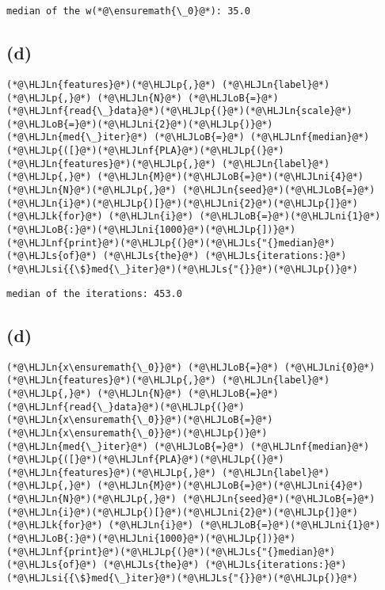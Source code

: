 \documentclass[12pt,a4paper]{article}
\newcommand{\HLJLk}[1]{\textcolor[RGB]{148,91,176}{\textbf{#1}}}
\newcommand{\HLJLn}[1]{#1}
\newcommand{\HLJLnf}[1]{\textcolor[RGB]{66,102,213}{#1}}
\newcommand{\HLJLs}[1]{\textcolor[RGB]{201,61,57}{#1}}
\newcommand{\HLJLsi}[1]{#1}
\newcommand{\HLJLni}[1]{\textcolor[RGB]{59,151,46}{#1}}
\newcommand{\HLJLoB}[1]{\textcolor[RGB]{102,102,102}{\textbf{#1}}}
\newcommand{\HLJLp}[1]{#1}
\begin{document}
\begin{lstlisting}
median of the w(*@\ensuremath{\_0}@*): 35.0
\end{lstlisting}


\subsection{(d)}

\begin{lstlisting}
(*@\HLJLn{features}@*)(*@\HLJLp{,}@*) (*@\HLJLn{label}@*)(*@\HLJLp{,}@*) (*@\HLJLn{N}@*) (*@\HLJLoB{=}@*) (*@\HLJLnf{read{\_}data}@*)(*@\HLJLp{(}@*)(*@\HLJLn{scale}@*)(*@\HLJLoB{=}@*)(*@\HLJLni{2}@*)(*@\HLJLp{)}@*)
(*@\HLJLn{med{\_}iter}@*) (*@\HLJLoB{=}@*) (*@\HLJLnf{median}@*)(*@\HLJLp{([}@*)(*@\HLJLnf{PLA}@*)(*@\HLJLp{(}@*)(*@\HLJLn{features}@*)(*@\HLJLp{,}@*) (*@\HLJLn{label}@*)(*@\HLJLp{,}@*) (*@\HLJLn{M}@*)(*@\HLJLoB{=}@*)(*@\HLJLni{4}@*)(*@\HLJLn{N}@*)(*@\HLJLp{,}@*) (*@\HLJLn{seed}@*)(*@\HLJLoB{=}@*)(*@\HLJLn{i}@*)(*@\HLJLp{)[}@*)(*@\HLJLni{2}@*)(*@\HLJLp{]}@*) (*@\HLJLk{for}@*) (*@\HLJLn{i}@*) (*@\HLJLoB{=}@*)(*@\HLJLni{1}@*)(*@\HLJLoB{:}@*)(*@\HLJLni{1000}@*)(*@\HLJLp{])}@*)
(*@\HLJLnf{print}@*)(*@\HLJLp{(}@*)(*@\HLJLs{"{}median}@*) (*@\HLJLs{of}@*) (*@\HLJLs{the}@*) (*@\HLJLs{iterations:}@*) (*@\HLJLsi{{\$}med{\_}iter}@*)(*@\HLJLs{"{}}@*)(*@\HLJLp{)}@*)
\end{lstlisting}

\begin{lstlisting}
median of the iterations: 453.0
\end{lstlisting}


\subsection{(d)}

\begin{lstlisting}
(*@\HLJLn{x\ensuremath{\_0}}@*) (*@\HLJLoB{=}@*) (*@\HLJLni{0}@*)
(*@\HLJLn{features}@*)(*@\HLJLp{,}@*) (*@\HLJLn{label}@*)(*@\HLJLp{,}@*) (*@\HLJLn{N}@*) (*@\HLJLoB{=}@*) (*@\HLJLnf{read{\_}data}@*)(*@\HLJLp{(}@*)(*@\HLJLn{x\ensuremath{\_0}}@*)(*@\HLJLoB{=}@*)(*@\HLJLn{x\ensuremath{\_0}}@*)(*@\HLJLp{)}@*)
(*@\HLJLn{med{\_}iter}@*) (*@\HLJLoB{=}@*) (*@\HLJLnf{median}@*)(*@\HLJLp{([}@*)(*@\HLJLnf{PLA}@*)(*@\HLJLp{(}@*)(*@\HLJLn{features}@*)(*@\HLJLp{,}@*) (*@\HLJLn{label}@*)(*@\HLJLp{,}@*) (*@\HLJLn{M}@*)(*@\HLJLoB{=}@*)(*@\HLJLni{4}@*)(*@\HLJLn{N}@*)(*@\HLJLp{,}@*) (*@\HLJLn{seed}@*)(*@\HLJLoB{=}@*)(*@\HLJLn{i}@*)(*@\HLJLp{)[}@*)(*@\HLJLni{2}@*)(*@\HLJLp{]}@*) (*@\HLJLk{for}@*) (*@\HLJLn{i}@*) (*@\HLJLoB{=}@*)(*@\HLJLni{1}@*)(*@\HLJLoB{:}@*)(*@\HLJLni{1000}@*)(*@\HLJLp{])}@*)
(*@\HLJLnf{print}@*)(*@\HLJLp{(}@*)(*@\HLJLs{"{}median}@*) (*@\HLJLs{of}@*) (*@\HLJLs{the}@*) (*@\HLJLs{iterations:}@*) (*@\HLJLsi{{\$}med{\_}iter}@*)(*@\HLJLs{"{}}@*)(*@\HLJLp{)}@*)
\end{lstlisting}
\end{document}
